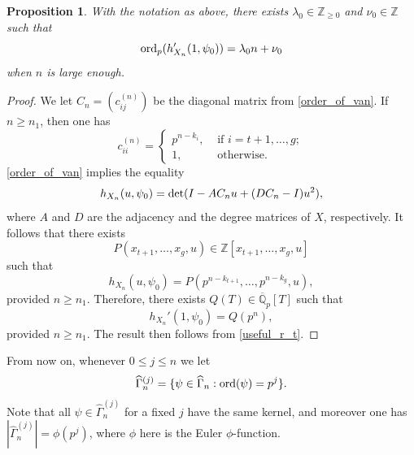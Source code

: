 \documentclass[11pt]{amsart}
\newtheorem{proposition}[theorem]{Proposition}
\numberwithin{equation}{section}
\theoremstyle{remark}
\theoremstyle{definition}
\begin{document}
\begin{proposition} \label{tc_i}
With the notation as above, there exists $\lambda_{0} \in \mathbb{Z}_{\ge 0}$ and $\nu_{0} \in \mathbb{Z}$ such that
$${\rm ord}_{p}(h_{X_{n}}'(1,\psi_{0})) = \lambda_{0} n + \nu_{0} $$
when $n$ is large enough.
\end{proposition}
\begin{proof}
We let $C_{n} = (c_{ij}^{(n)})$ be the diagonal matrix from \cref{order_of_van}.  If $n \ge n_{1}$, then one has
\begin{equation*}
c_{ii}^{(n)} = 
\begin{cases}
p^{n-k_{i}}, &\text{ if } i=t+1,\ldots,g; \\
1, &\text{ otherwise}.
\end{cases}
\end{equation*}
\cref{order_of_van} implies the equality
$$h_{X_{n}}(u,\psi_{0}) = {\rm det}(I - AC_{n}u + (DC_{n} - I)u^{2}), $$
where $A$ and $D$ are the adjacency and the degree matrices of $X$, respectively.  It follows that there exists
$$P(x_{t+1},\ldots,x_{g},u) \in \mathbb{Z}[x_{t+1},\ldots,x_{g},u] $$
such that
$$h_{X_{n}}(u,\psi_{0}) = P(p^{n - k_{t+1}},\ldots,p^{n - k_{g}},u),$$
provided $n \ge n_{1}$.  Therefore, there exists $Q(T) \in \overline{\mathbb{Q}}_{p}[T]$ such that
$$h_{X_{n}}'(1,\psi_{0}) = Q(p^{n}), $$
provided $n \ge n_{1}$.  The result then follows from \cref{useful_r_t}.
\end{proof}
From now on, whenever $0 \le j \le n$ we let
$$\widehat{\Gamma}_{n}^{(j)} = \{\psi \in \widehat{\Gamma}_{n}: {\rm ord}(\psi) = p^{j} \}.$$ 
Note that all $\psi \in \widehat{\Gamma}_{n}^{(j)}$ for a fixed $j$ have the same kernel, and moreover one has $|\widehat{\Gamma}_{n}^{(j)}| =\phi(p^{j})$, where $\phi$ here is the Euler $\phi$-function.
\end{document}
